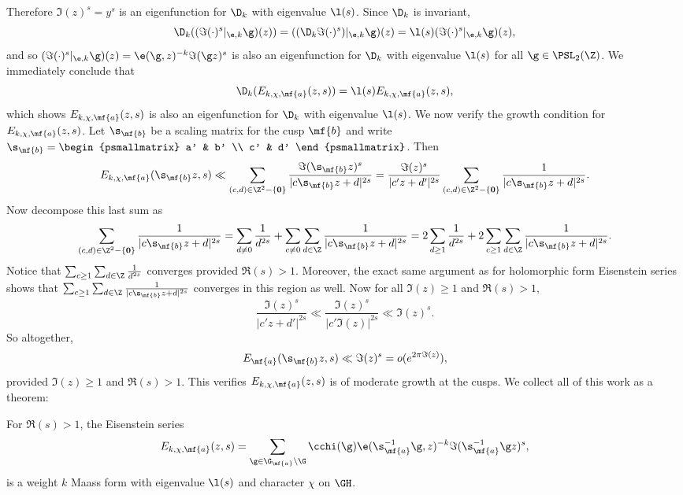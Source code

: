     Therefore $\Im(z)^{s} = y^{s}$ is an eigenfunction for $\D_{k}$ with eigenvalue $\l(s)$. Since $\D_{k}$ is invariant,
    \[
      \D_{k}((\Im(\cdot)^{s}|_{\e,k}\g)(z)) = ((\D_{k}\Im(\cdot)^{s})|_{\e,k}\g)(z) = \l(s)(\Im(\cdot)^{s}|_{\e,k}\g)(z),
    \]
    and so $(\Im(\cdot)^{s}|_{\e,k}\g)(z) = \e(\g,z)^{-k}\Im(\g z)^{s}$ is also an eigenfunction for $\D_{k}$ with eigenvalue $\l(s)$ for all $\g \in \PSL_{2}(\Z)$. We immediately conclude that
    \[
      \D_{k}(E_{k,\chi,\mf{a}}(z,s)) = \l(s)E_{k,\chi,\mf{a}}(z,s),
    \]
    which shows $E_{k,\chi,\mf{a}}(z,s)$ is also an eigenfunction for $\D_{k}$ with eigenvalue $\l(s)$. We now verify the growth condition for $E_{k,\chi,\mf{a}}(z,s)$. Let $\s_{\mf{b}}$ be a scaling matrix for the cusp $\mf{b}$ and write $\s_{\mf{b}} = \begin{psmallmatrix} a' & b' \\ c' & d' \end{psmallmatrix}$. Then
    \[
      E_{k,\chi,\mf{a}}(\s_{\mf{b}}z,s) \ll \sum_{(c,d) \in \Z^{2}-\{\mathbf{0}\}}\frac{\Im(\s_{\mf{b}}z)^{s}}{|c\s_{\mf{b}}z+d|^{2s}} = \frac{\Im(z)^{s}}{|c'z+d'|^{2s}}\sum_{(c,d) \in \Z^{2}-\{\mathbf{0}\}}\frac{1}{|c\s_{\mf{b}}z+d|^{2s}}.
    \]
    Now decompose this last sum as
    \[
      \sum_{(c,d) \in \Z^{2}-\{\mathbf{0}\}}\frac{1}{|c\s_{\mf{b}}z+d|^{2s}} = \sum_{d \neq 0}\frac{1}{d^{2s}}+\sum_{c \neq 0}\sum_{d \in \Z}\frac{1}{|c\s_{\mf{b}}z+d|^{2s}} = 2\sum_{d \ge 1}\frac{1}{d^{2s}}+2\sum_{c \ge 1}\sum_{d \in \Z}\frac{1}{|c\s_{\mf{b}}z+d|^{2s}}.
    \]
    Notice that $\sum_{c \ge 1}\sum_{d \in \Z}\frac{1}{d^{2s}}$ converges provided $\Re(s) > 1$. Moreover, the exact same argument as for holomorphic form Eisenstein series shows that $\sum_{c \ge 1}\sum_{d \in \Z}\frac{1}{|c\s_{\mf{b}}z+d|^{2s}}$ converges in this region as well. Now for all $\Im(z) \ge 1$ and $\Re(s) > 1$,
    \[
      \frac{\Im(z)^{s}}{|c'z+d'|^{2s}} \ll \frac{\Im(z)^{s}}{|c'\Im(z)|^{2s}} \ll \Im(z)^{s}.
    \]
    So altogether,
    \[
      E_{\mf{a}}(\s_{\mf{b}}z,s) \ll \Im(z)^{s} = o(e^{2\pi\Im(z)}),
    \]
    provided $\Im(z) \ge 1$ and $\Re(s) > 1$. This verifies $E_{k,\chi,\mf{a}}(z,s)$ is of moderate growth at the cusps. We collect all of this work as a theorem:

    \begin{theorem}
      For $\Re(s) > 1$, the Eisenstein series
      \[
          E_{k,\chi,\mf{a}}(z,s) = \sum_{\g \in \G_{\mf{a}}\backslash\G}\cchi(\g)\e(\s_{\mf{a}}^{-1}\g,z)^{-k}\Im(\s_{\mf{a}}^{-1}\g z)^{s},
      \]
      is a weight $k$ Maass form with eigenvalue $\l(s)$ and character $\chi$ on $\GH$.
    \end{theorem}

